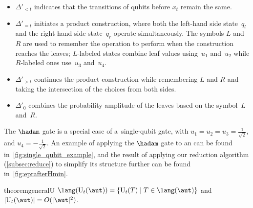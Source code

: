 \figSingleQubitExample    %

\begin{itemize}
    \item $\Delta'_{< t}$ indicates that the transitions of qubits before $x_t$ remain the same.

    \item $\Delta'_{= t}$ initiates a product construction, where both the
      left-hand side state~$q_l$ and the right-hand side state~$q_r$ operate simultaneously.
      The symbols $L$ and $R$ are used to remember the operation to perform when
      the construction reaches the leaves; $L$-labeled states combine leaf
      values using~$u_1$ and~$u_2$ while $R$-labeled ones use~$u_3$ and~$u_4$.

    \item $\Delta'_{> t}$ continues the product construction while remembering
      $L$ and $R$ and taking the intersection of the choices from both sides.

    \item $\Delta'_{0}$ combines the probability amplitude of the leaves based
      on the symbol~$L$ and~$R$.
\end{itemize}
%
The $\hadam$ gate is a special case of a~single-qubit gate, with
$u_1=u_2=u_3=\frac{1}{\sqrt{2}}$, and $u_4=-\frac{1}{\sqrt{2}}$. An example of
applying the $\hadam$ gate to an \lsta can be found in~\cref{fig:single_qubit_example}, and the result of applying our \lsta reduction algorithm (\cref{subsec:reduce}) to simplify its structure further can be found in~\cref{fig:eprafterHmin}.





\algUGate

\begin{restatable}{theorem}{generalU}\label{thm:generalU}
 	$\lang( \mathrm{U}_t(\aut) )  = \{\mathrm{U}_t(T) \mid  T\in \lang(\aut) \}$ and $|\mathrm{U}_t(\aut)|=O(|\aut|^2)$.
\end{restatable}



\newcommand{\figCXGate}[0]{
\begin{wrapfigure}[11]{r}{10.2cm}
    \vspace{-5mm}
    \hspace*{-3mm}
    \begin{minipage}{1.1\textwidth}
    \scalebox{0.7}{
      
    }
    \end{minipage}
   \vspace{-4mm}
   \caption{An \lsta obtained after applying $\cnot^1_2$ to the \lsta in \cref{fig:eprafterHmin}}
    \label{fig:afterEPR}
\end{wrapfigure}
}

